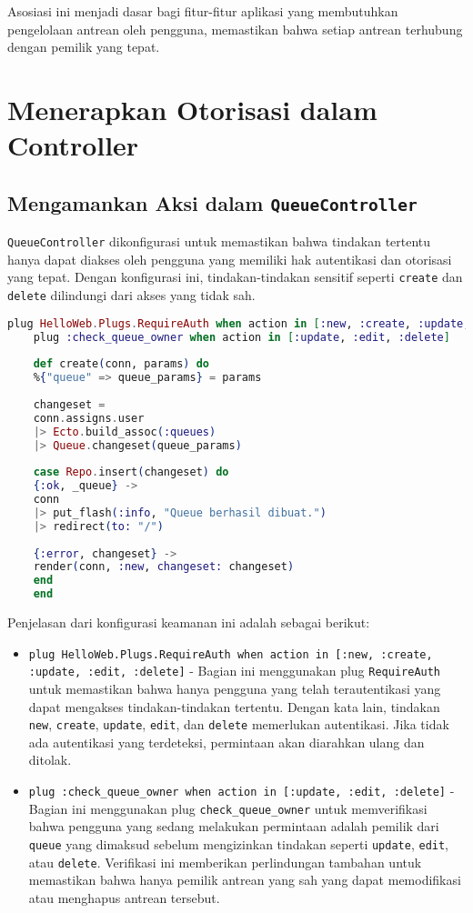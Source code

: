 Asosiasi ini menjadi dasar bagi fitur-fitur aplikasi yang membutuhkan pengelolaan antrean oleh pengguna, memastikan bahwa setiap antrean terhubung dengan pemilik yang tepat.


\section{Menerapkan Otorisasi dalam Controller}

\subsection{Mengamankan Aksi dalam \texttt{QueueController}}
\texttt{QueueController} dikonfigurasi untuk memastikan bahwa tindakan tertentu hanya dapat diakses oleh pengguna yang memiliki hak autentikasi dan otorisasi yang tepat. Dengan konfigurasi ini, tindakan-tindakan sensitif seperti \texttt{create} dan \texttt{delete} dilindungi dari akses yang tidak sah.

\begin{lstlisting}[language=Elixir, caption={\texttt{lib/hello\_web/controllers/queue\_controller.ex}}]
	plug HelloWeb.Plugs.RequireAuth when action in [:new, :create, :update, :edit, :delete]
	plug :check_queue_owner when action in [:update, :edit, :delete]
	
	def create(conn, params) do
	%{"queue" => queue_params} = params
	
	changeset =
	conn.assigns.user
	|> Ecto.build_assoc(:queues)
	|> Queue.changeset(queue_params)
	
	case Repo.insert(changeset) do
	{:ok, _queue} ->
	conn
	|> put_flash(:info, "Queue berhasil dibuat.")
	|> redirect(to: "/")
	
	{:error, changeset} ->
	render(conn, :new, changeset: changeset)
	end
	end
\end{lstlisting}

Penjelasan dari konfigurasi keamanan ini adalah sebagai berikut:

\begin{itemize}
	\item \texttt{plug HelloWeb.Plugs.RequireAuth when action in [:new, :create, :update, :edit, :delete]} - Bagian ini menggunakan plug \texttt{RequireAuth} untuk memastikan bahwa hanya pengguna yang telah terautentikasi yang dapat mengakses tindakan-tindakan tertentu. Dengan kata lain, tindakan \texttt{new}, \texttt{create}, \texttt{update}, \texttt{edit}, dan \texttt{delete} memerlukan autentikasi. Jika tidak ada autentikasi yang terdeteksi, permintaan akan diarahkan ulang dan ditolak.
	
	\item \texttt{plug :check\_queue\_owner when action in [:update, :edit, :delete]} - Bagian ini menggunakan plug \texttt{check\_queue\_owner} untuk memverifikasi bahwa pengguna yang sedang melakukan permintaan adalah pemilik dari \texttt{queue} yang dimaksud sebelum mengizinkan tindakan seperti \texttt{update}, \texttt{edit}, atau \texttt{delete}. Verifikasi ini memberikan perlindungan tambahan untuk memastikan bahwa hanya pemilik antrean yang sah yang dapat memodifikasi atau menghapus antrean tersebut.
\end{itemize}

